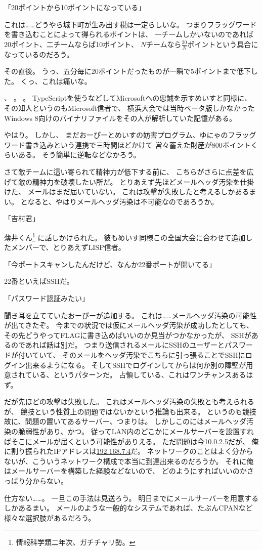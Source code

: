 「20ポイントから10ポイントになっている」

これは……どうやら城下町が生み出す税は一定らしいな。
つまりフラッグワードを書き込むことによって得られるポイントは、
一チームしかいないのであれば20ポイント、二チームならば10ポイント、
$N$チームなら$\frac{20}{N}$ポイントという具合になっているのだろう。

その直後。
うっ、五分毎に20ポイントだったものが一瞬で5ポイントまで低下した。
くっ、これは痛いな。

、
。
。
TypeScriptを使うなどしてMicrosoftへの忠誠を示すめいすと同様に、
その知人というのもMicrosoft信者で、
横浜大会では当時ベータ版しかなかったWindows 8向けのバイナリファイルをその人が解析していた記憶がある。

やはり。
しかし、
まだおーぴーとめいすの妨害プログラム、ゆにゃのフラッグワード書き込みという連携で三時間ほどかけて
営々蓄えた財産が800ポイントくらいある。
そう簡単に逆転などなかろう。

さて敵チームに這い寄られて精神力が低下する前に、
こちらがさらに点差を広げて敵の精神力を破壊したい所だ。
とりあえず先ほどメールヘッダ汚染を仕掛けた、
メールはまだ届いていない。
これは攻撃が失敗したと考えるしかあるまい。
となると、やはりメールヘッダ汚染は不可能なのであろうか。

「吉村君」

薄井くん\footnote{情報科学類二年次、ガチチャリ勢。}%
に話しかけられた。
彼もめいす同様この全国大会に合わせて追加したメンバーで、とりあえずLISP信者。

「今ポートスキャンしたんだけど、なんか22番ポートが開いてる」

22番といえばSSHだ。

「パスワード認証みたい」

聞き耳を立てていたおーぴーが追加する。
これは……メールヘッダ汚染の可能性が出てきたぞ。
今までの状況では仮にメールヘッダ汚染が成功したとしても、
その先どうやってFLAGに書き込めばいいのか見当がつかなかったが、
SSHがあるのであれば話は別だ。
つまり送信されるメールにSSHのユーザーとパスワードが付いていて、
そのメールをヘッダ汚染でこちらに引っ張ることでSSHにログイン出来るようになる。
そしてSSHでログインしてからは何か別の障壁が用意されている、というパターンだ。
占領している、これはワンチャンスあるはず。

だが先ほどの攻撃は失敗した。
これはメールヘッダ汚染の失敗とも考えられるが、
競技という性質上の問題ではないかという推論も出来る。
というのも競技故に、問題の置いてあるサーバー、つまりは。
しかしこのにはメールヘッダ汚染の脆弱性があり、かつ。
従ってLAN内のどこかにメールサーバーを設置すればそこにメールが届くという可能性がありえる。
ただ問題は今\url{10.0.2.5}だが、
俺に割り振られたIPアドレスは\url{192.168.7.4}だ。
ネットワークのことはよく分からないが、こういうネットワーク構成で本当に到達出来るのだろうか。
それに俺はメールサーバーを構築した経験などないので、
どのようにすればいいのかさっぱり分からない。

仕方ない……。
一旦この手法は見送ろう。
明日までにメールサーバーを用意するしかあるまい。
メールのような一般的なシステムであれば、たぶんCPANなど様々な選択肢があるだろう。

